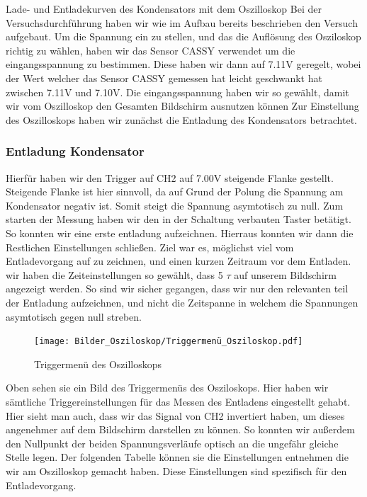 \documentclass[twoside]{protokoll}
\begin{document}
\begin{aufgabe}{Lade- und Entladekurven des Kondensators mit dem Oszilloskop}
  Bei der Versuchsdurchführung haben wir wie im Aufbau bereits beschrieben den Versuch 
  aufgebaut. Um die Spannung ein zu stellen, und das die Auflösung des Osziloskop richtig zu
  wählen, haben wir das Sensor CASSY verwendet um die eingangsspannung zu bestimmen. Diese haben
  wir dann auf 7.11V geregelt, wobei der Wert welcher das Sensor CASSY gemessen hat leicht 
  geschwankt hat zwischen 7.11V und 7.10V. Die eingangsspannung haben wir so gewählt, 
  damit wir vom Oszilloskop den Gesamten Bildschirm ausnutzen können Zur Einstellung des     Oszilloskops haben wir zunächst die Entladung des Kondensators betrachtet. 
  
  \subsubsection{Entladung Kondensator}
  
  Hierfür haben wir den Trigger auf CH2 auf 7.00V 
   steigende Flanke gestellt. Steigende Flanke ist hier sinnvoll, da auf Grund der Polung 
  die Spannung am Kondensator negativ ist. Somit steigt die Spannung asymtotisch zu null. 
  Zum starten der Messung haben wir den in der Schaltung verbauten Taster betätigt.
  So konnten wir eine erste entladung aufzeichnen. Hierraus konnten wir dann die Restlichen 
  Einstellungen schließen. Ziel war es, möglichst viel vom Entladevorgang auf zu zeichnen, und 
  einen kurzen Zeitraum vor dem Entladen.
  wir haben die Zeiteinstellungen so gewählt, dass 5 $\tau$ auf unserem Bildschirm angezeigt
  werden. So sind wir sicher gegangen, dass wir nur den relevanten teil der Entladung aufzeichnen, 
  und nicht die Zeitspanne in welchem die Spannungen asymtotisch gegen null streben. 

	
\begin{figure}[H]
  \centering
  \texttt{[image: Bilder\_Osziloskop/Triggermenü\_Osziloskop.pdf]}
  \caption{Triggermenü des Oszilloskops}
  \centering
\end{figure}

Oben sehen sie ein Bild des Triggermenüs des Osziloskops. Hier haben wir sämtliche Triggereinstellungen für das Messen des Entladens eingestellt gehabt. 
Hier sieht man auch, dass wir das Signal von CH2 invertiert haben, um dieses angenehmer
auf dem Bildschirm darstellen zu können. So konnten wir außerdem den Nullpunkt der beiden 
Spannungsverläufe optisch an die ungefähr gleiche Stelle legen. Der folgenden Tabelle
können sie die Einstellungen entnehmen die wir am Oszilloskop gemacht haben.
Diese Einstellungen sind spezifisch für den Entladevorgang.



\end{aufgabe}
\end{document}
